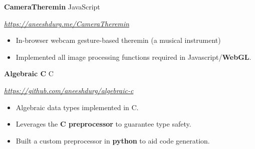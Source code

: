 \documentclass[paper=a4,fontsize=10pt]{scrartcl} %
\newcommand{\sepspace}{\vspace*{1em}}		%
\newcommand{\EducationEntry}[4]{
		\noindent \textbf{#1}     %
			\hfill#2 \par  %
		\noindent \textit{#3} \par        %
		\noindent\hangafter=0 \small #4 %
		\normalsize \par}
\begin{document}
\begin{minipage}[t]{0.75\textwidth}

\EducationEntry{CameraTheremin}{JavaScript}{\url{https://aneeshdurg.me/CameraTheremin}}{
\begin{itemize}
\item In-browser webcam gesture-based theremin (a musical instrument)
\item Implemented all image processing functions required in Javascript/\textbf{WebGL}.
\end{itemize}
}
\sepspace

\EducationEntry{Algebraic C}{C}{\url{https://github.com/aneeshdurg/algebraic-c}}{
\begin{itemize}
\item Algebraic data types implemented in C.
\item Leverages the \textbf{C preprocessor} to guarantee type safety.
\item Built a custom preprocessor in \textbf{python} to aid code generation.
\end{itemize}
}
\sepspace


\end{minipage}
\end{document}
